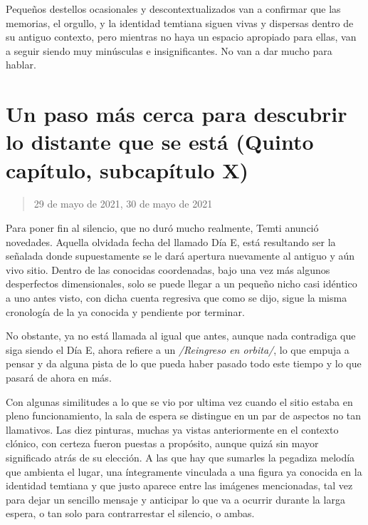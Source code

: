 \documentclass[
  spanish,
]{book}
\begin{document}
Pequeños destellos ocasionales y descontextualizados van a confirmar que las memorias, el orgullo, y la identidad temtiana siguen vivas y dispersas dentro de su antiguo contexto, pero mientras no haya un espacio apropiado para ellas, van a seguir siendo muy minúsculas e insignificantes. No van a dar mucho para hablar.

\hypertarget{un-paso-muxe1s-cerca-para-descubrir-lo-distante-que-se-estuxe1-quinto-capuxedtulo-subcapuxedtulo-x}{%
\section{Un paso más cerca para descubrir lo distante que se está (Quinto capítulo, subcapítulo X)}\label{un-paso-muxe1s-cerca-para-descubrir-lo-distante-que-se-estuxe1-quinto-capuxedtulo-subcapuxedtulo-x}}

\begin{quote}
29 de mayo de 2021, 30 de mayo de 2021
\end{quote}

Para poner fin al silencio, que no duró mucho realmente, Temti anunció novedades. Aquella olvidada fecha del llamado Día E, está resultando ser la señalada donde supuestamente se le dará apertura nuevamente al antiguo y aún vivo sitio. Dentro de las conocidas coordenadas, bajo una vez más algunos desperfectos dimensionales, solo se puede llegar a un pequeño nicho casi idéntico a uno antes visto, con dicha cuenta regresiva que como se dijo, sigue la misma cronología de la ya conocida y pendiente por terminar.

No obstante, ya no está llamada al igual que antes, aunque nada contradiga que siga siendo el Día E, ahora refiere a un \emph{/Reingreso en orbita/}, lo que empuja a pensar y da alguna pista de lo que pueda haber pasado todo este tiempo y lo que pasará de ahora en más.

Con algunas similitudes a lo que se vio por ultima vez cuando el sitio estaba en pleno funcionamiento, la sala de espera se distingue en un par de aspectos no tan llamativos. Las diez pinturas, muchas ya vistas anteriormente en el contexto clónico, con certeza fueron puestas a propósito, aunque quizá sin mayor significado atrás de su elección. A las que hay que sumarles la pegadiza melodía que ambienta el lugar, una íntegramente vinculada a una figura ya conocida en la identidad temtiana y que justo aparece entre las imágenes mencionadas, tal vez para dejar un sencillo mensaje y anticipar lo que va a ocurrir durante la larga espera, o tan solo para contrarrestar el silencio, o ambas.
\end{document}
